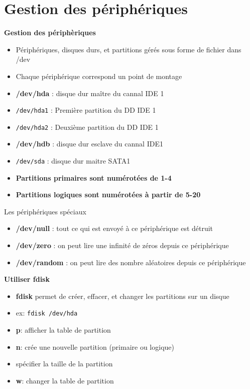 \documentclass[french]{beamer}
\begin{document}
\section{Gestion des périphériques}
\frame{\tableofcontents[current]}

\begin{frame}
\begin{center}
\textbf{Gestion des périphèriques}
\end{center}
\begin{itemize}
\item Périphériques, disques durs, et partitions gérés sous forme de fichier dans /dev
\item Chaque périphérique correspond un point de montage
\item \textbf{/dev/hda} : disque dur maître du cannal IDE 1
\item \texttt{/dev/hda1} : Première partition du DD IDE 1
\item \texttt{/dev/hda2} : Deuxième partition du DD IDE 1
\item \textbf{/dev/hdb} : disque dur esclave du cannal IDE1
\item \texttt{/dev/sda} : disque dur maitre SATA1
\item \textbf{Partitions primaires sont numérotées de 1-4}
\item \textbf{Partitions logiques sont numérotées à partir de 5-20}
\end{itemize}
\end{frame}

\begin{frame}
Les périphériques spéciaux
	\begin{itemize}
	\item \textbf{/dev/null} : tout ce qui est envoyé à ce périphérique est détruit
	\item \textbf{/dev/zero} : on peut lire une infinité de zéros depuis ce périphérique
	\item \textbf{/dev/random} : on peut lire des nombre aléatoires depuis ce périphérique
	\end{itemize}
\end{frame}




\begin{frame}
\textbf{Utiliser fdisk}
\begin{itemize}
\item \textbf{fdisk} permet de créer, effacer, et changer les partitions sur
un disque
\item ex: \texttt{fdisk /dev/hda}
\item \textbf{p}: afficher la table de partition
\item \textbf{n}: crée une nouvelle partition (primaire ou logique)
\item spécifier la taille de la partition
\item \textbf{w}: changer la table de partition
\end{itemize}
\end{frame}
\end{document}
